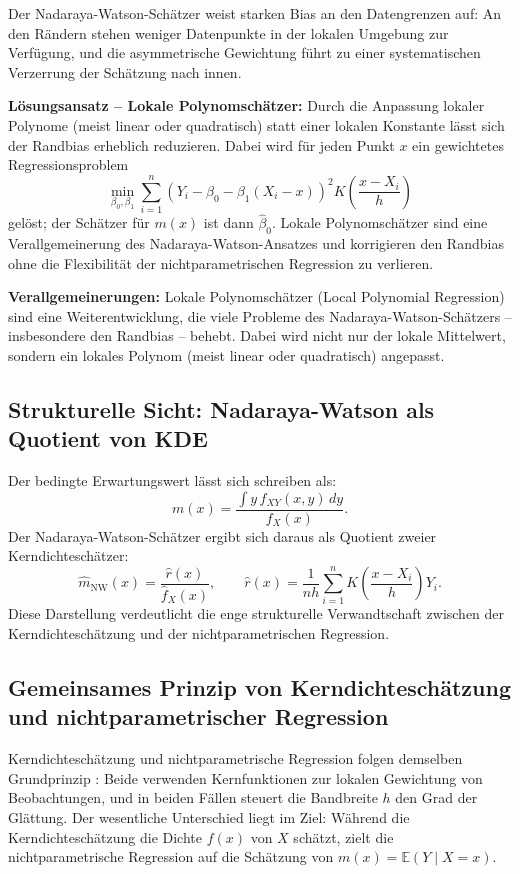 \documentclass[a4paper, 11pt]{scrartcl}
\begin{document}
Der Nadaraya-Watson-Schätzer weist starken Bias an den Datengrenzen auf: An den Rändern stehen weniger Datenpunkte in der lokalen Umgebung zur Verfügung, und die asymmetrische Gewichtung führt zu einer systematischen Verzerrung der Schätzung nach innen.

\textbf{Lösungsansatz – Lokale Polynomschätzer:} Durch die Anpassung lokaler Polynome (meist linear oder quadratisch) statt einer lokalen Konstante lässt sich der Randbias erheblich reduzieren. Dabei wird für jeden Punkt $x$ ein gewichtetes Regressionsproblem
\[
\min_{\beta_0, \beta_1} \sum_{i=1}^n \left(Y_i - \beta_0 - \beta_1(X_i - x)\right)^2 K\!\left(\frac{x - X_i}{h}\right)
\]
gelöst; der Schätzer für $m(x)$ ist dann $\hat{\beta}_0$. Lokale Polynomschätzer sind eine Verallgemeinerung des Nadaraya-Watson-Ansatzes und korrigieren den Randbias ohne die Flexibilität der nichtparametrischen Regression zu verlieren.

\textbf{Verallgemeinerungen:} Lokale Polynomschätzer (Local Polynomial Regression) sind eine Weiterentwicklung, die viele Probleme des Nadaraya-Watson-Schätzers – insbesondere den Randbias – behebt. Dabei wird nicht nur der lokale Mittelwert, sondern ein lokales Polynom (meist linear oder quadratisch) angepasst.

\subsection{Strukturelle Sicht: Nadaraya-Watson als Quotient von KDE}

Der bedingte Erwartungswert lässt sich schreiben als:
\[
m(x) = \frac{\int y\, f_{XY}(x,y)\, dy}{f_X(x)}.
\]
Der Nadaraya-Watson-Schätzer ergibt sich daraus als Quotient zweier Kerndichteschätzer:
\[
\hat{m}_{\text{NW}}(x) = \frac{\hat{r}(x)}{\hat{f}_X(x)},
\qquad
\hat{r}(x) = \frac{1}{nh} \sum_{i=1}^n K\!\left(\frac{x-X_i}{h}\right) Y_i.
\]
Diese Darstellung verdeutlicht die enge strukturelle Verwandtschaft zwischen der Kerndichteschätzung und der nichtparametrischen Regression.

\subsection{Gemeinsames Prinzip von Kerndichteschätzung und nichtparametrischer Regression}

Kerndichteschätzung und nichtparametrische Regression folgen demselben Grundprinzip \cite{BüningTrenkler+1994, lang2004civ}: Beide verwenden Kernfunktionen zur lokalen Gewichtung von Beobachtungen, und in beiden Fällen steuert die Bandbreite $h$ den Grad der Glättung. Der wesentliche Unterschied liegt im Ziel: Während die Kerndichteschätzung die Dichte $f(x)$ von $X$ schätzt, zielt die nichtparametrische Regression auf die Schätzung von $m(x) = \mathbb{E}(Y \mid X = x)$.
\end{document}
